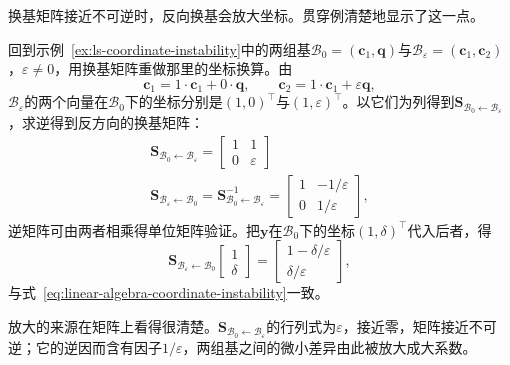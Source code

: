 换基矩阵接近不可逆时，反向换基会放大坐标。贯穿例清楚地显示了这一点。
\begin{example}[近共线基之间的换基]
\label{ex:ls-nearly-collinear-change-of-basis}
回到示例~\ref{ex:ls-coordinate-instability}中的两组基$\mathcal B_0=(\bm c_1,\bm q)$与$\mathcal B_\varepsilon=(\bm c_1,\bm c_2)$，$\varepsilon\neq0$，用换基矩阵重做那里的坐标换算。由
\[
 \bm c_1=1\cdot\bm c_1+0\cdot\bm q,\qquad \bm c_2=1\cdot\bm c_1+\varepsilon\bm q,
\]
$\mathcal B_\varepsilon$的两个向量在$\mathcal B_0$下的坐标分别是$(1,0)^{\top}$与$(1,\varepsilon)^{\top}$。以它们为列得到$\bm S_{\mathcal B_0\leftarrow\mathcal B_\varepsilon}$，求逆得到反方向的换基矩阵：
\[
\begin{gathered}
\bm S_{\mathcal B_0\leftarrow\mathcal B_\varepsilon}
 =\begin{bmatrix}1&1\\0&\varepsilon\end{bmatrix}\\
\bm S_{\mathcal B_\varepsilon\leftarrow\mathcal B_0}
 =\bm S_{\mathcal B_0\leftarrow\mathcal B_\varepsilon}^{-1}
 =\begin{bmatrix}1&-1/\varepsilon\\0&1/\varepsilon\end{bmatrix},
\end{gathered}
\]
逆矩阵可由两者相乘得单位矩阵验证。把$\bm y$在$\mathcal B_0$下的坐标$(1,\delta)^{\top}$代入后者，得
\[
 \bm S_{\mathcal B_\varepsilon\leftarrow\mathcal B_0}\begin{bmatrix}1\\\delta\end{bmatrix}
 =\begin{bmatrix}1-\delta/\varepsilon\\\delta/\varepsilon\end{bmatrix},
\]
与式~\eqref{eq:linear-algebra-coordinate-instability}一致。

放大的来源在矩阵上看得很清楚。$\bm S_{\mathcal B_0\leftarrow\mathcal B_\varepsilon}$的行列式为$\varepsilon$，接近零，矩阵接近不可逆；它的逆因而含有因子$1/\varepsilon$，两组基之间的微小差异由此被放大成大系数。
\end{example}

